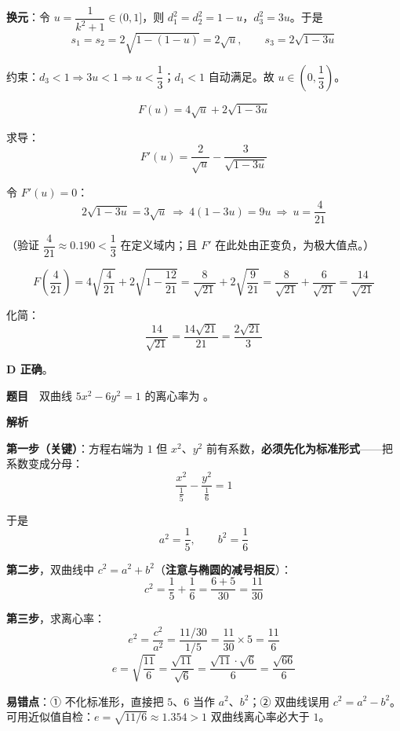 \textbf{换元}：令 $u=\dfrac{1}{k^2+1}\in(0,1]$，则 $d_1^2=d_2^2=1-u$，$d_3^2=3u$。于是
\[s_1=s_2=2\sqrt{1-(1-u)}=2\sqrt u,\qquad s_3=2\sqrt{1-3u}\]

约束：$d_3<1\Rightarrow 3u<1\Rightarrow u<\dfrac13$；$d_1<1$ 自动满足。故 $u\in\left(0,\dfrac13\right)$。

\[F(u)=4\sqrt u+2\sqrt{1-3u}\]

求导：
\[F'(u)=\frac{2}{\sqrt u}-\frac{3}{\sqrt{1-3u}}\]

令 $F'(u)=0$：
\[2\sqrt{1-3u}=3\sqrt u\ \Longrightarrow\ 4(1-3u)=9u\ \Longrightarrow\ u=\frac{4}{21}\]

（验证 $\dfrac{4}{21}\approx0.190<\dfrac13$  在定义域内；且 $F'$ 在此处由正变负，为极大值点。）

\[F\left(\frac4{21}\right)=4\sqrt{\frac4{21}}+2\sqrt{1-\frac{12}{21}}=\frac{8}{\sqrt{21}}+2\sqrt{\frac{9}{21}}=\frac{8}{\sqrt{21}}+\frac{6}{\sqrt{21}}=\frac{14}{\sqrt{21}}\]

化简：
\[\frac{14}{\sqrt{21}}=\frac{14\sqrt{21}}{21}=\frac{2\sqrt{21}}{3}\]

 \textbf{D 正确}。


\par\medskip



\textbf{题目}　双曲线 $5x^2-6y^2=1$ 的离心率为 \gkblank{}。

\textbf{解析}

\textbf{第一步（关键）}：方程右端为 $1$ 但 $x^2$、$y^2$ 前有系数，\textbf{必须先化为标准形式}——把系数变成分母：
\[\frac{x^2}{\frac15}-\frac{y^2}{\frac16}=1\]

于是
\[a^2=\frac15,\qquad b^2=\frac16\]

\textbf{第二步}，双曲线中 $c^2=a^2+b^2$（\textbf{注意与椭圆的减号相反}）：
\[c^2=\frac15+\frac16=\frac{6+5}{30}=\frac{11}{30}\]

\textbf{第三步}，求离心率：
\[e^2=\frac{c^2}{a^2}=\frac{11/30}{1/5}=\frac{11}{30}\times 5=\frac{11}{6}\]
\[e=\sqrt{\frac{11}{6}}=\frac{\sqrt{11}}{\sqrt6}=\frac{\sqrt{11}\cdot\sqrt6}{6}=\frac{\sqrt{66}}{6}\]


\begin{gktip}
\textbf{易错点}：① 不化标准形，直接把 $5$、$6$ 当作 $a^2$、$b^2$；② 双曲线误用 $c^2=a^2-b^2$。可用近似值自检：$e=\sqrt{11/6}\approx1.354>1$  双曲线离心率必大于 $1$。
\end{gktip}

